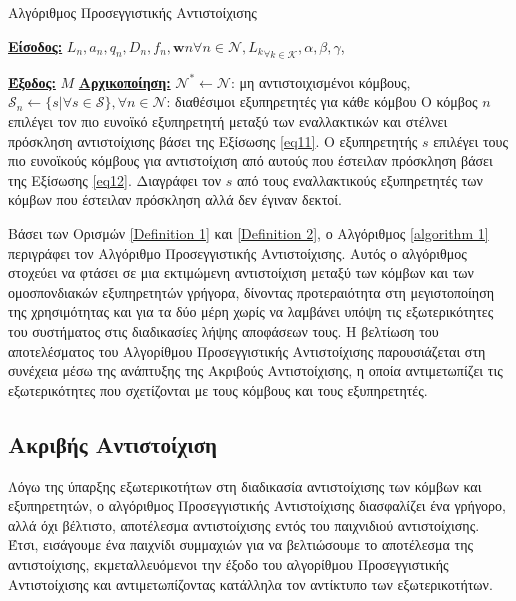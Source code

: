 \begin{algorithm}[h]
\caption{Αλγόριθμος Προσεγγιστικής Αντιστοίχισης} \label{algorithm 1}
\begin{algorithmic}[1]
\STATE \textbf{\underline{Είσοδος:}} ${L_n, a_n, q_n, D_n, f_n, \mathbf{w}n}{\forall n\in \mathcal{N}}, {L_k}_{\forall k \in \mathcal{K}}, \alpha,\beta,\gamma$,

\STATE \textbf{\underline{Έξοδος:}}  $M$
\STATE \textbf{\underline{Αρχικοποίηση:}} $\mathcal{N}^* \gets \mathcal{N}$: μη αντιστοιχισμένοι κόμβους, $\mathcal{S}_n \gets \{ s | \forall s \in \mathcal{S}\}, \forall n \in \mathcal{N}$: διαθέσιμοι εξυπηρετητές για κάθε κόμβου
\STATE Ο κόμβος $n$ επιλέγει τον πιο ευνοϊκό εξυπηρετητή μεταξύ των εναλλακτικών και στέλνει πρόσκληση αντιστοίχισης βάσει της Εξίσωσης \ref{eq11}.
\ENDFOR
{}
\STATE Ο εξυπηρετητής $s$ επιλέγει τους πιο ευνοϊκούς κόμβους για αντιστοίχιση από αυτούς που έστειλαν πρόσκληση βάσει της Εξίσωσης \ref{eq12}.
\STATE Διαγράφει τον $s$ από τους εναλλακτικούς εξυπηρετητές των κόμβων που έστειλαν πρόσκληση αλλά δεν έγιναν δεκτοί.
\ENDIF
\ENDFOR
\ENDWHILE
\end{algorithmic}
\end{algorithm}
\vspace{-7pt}
Βάσει των Ορισμών \ref{Definition 1} και \ref{Definition 2}, ο Αλγόριθμος \ref{algorithm 1} περιγράφει τον Αλγόριθμο Προσεγγιστικής Αντιστοίχισης. Αυτός ο αλγόριθμος στοχεύει να φτάσει σε μια εκτιμώμενη αντιστοίχιση μεταξύ των κόμβων και των ομοσπονδιακών εξυπηρετητών γρήγορα, δίνοντας προτεραιότητα στη μεγιστοποίηση της χρησιμότητας και για τα δύο μέρη χωρίς να λαμβάνει υπόψη τις εξωτερικότητες του συστήματος στις διαδικασίες λήψης αποφάσεων τους. Η βελτίωση του αποτελέσματος του Αλγορίθμου Προσεγγιστικής Αντιστοίχισης παρουσιάζεται στη συνέχεια μέσω της ανάπτυξης της Ακριβούς Αντιστοίχισης, η οποία αντιμετωπίζει τις εξωτερικότητες που σχετίζονται με τους κόμβους και τους εξυπηρετητές.

\subsection{Ακριβής Αντιστοίχιση}

Λόγω της ύπαρξης εξωτερικοτήτων στη διαδικασία αντιστοίχισης των κόμβων και εξυπηρετητών, ο αλγόριθμος Προσεγγιστικής Αντιστοίχισης διασφαλίζει ένα γρήγορο, αλλά όχι βέλτιστο, αποτέλεσμα αντιστοίχισης εντός του παιχνιδιού αντιστοίχισης. Έτσι, εισάγουμε ένα παιχνίδι συμμαχιών για να βελτιώσουμε το αποτέλεσμα της αντιστοίχισης, εκμεταλλευόμενοι την έξοδο του αλγορίθμου Προσεγγιστικής Αντιστοίχισης και αντιμετωπίζοντας κατάλληλα τον αντίκτυπο των εξωτερικοτήτων.

